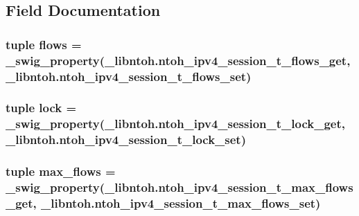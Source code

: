 \subsection{Field Documentation}
\hypertarget{classlibntoh_1_1ntoh__ipv4__session__t_afca3cb4196e6410df799227741f11b5e}{
\subsubsection[{flows}]{\setlength{\rightskip}{0pt plus 5cm}tuple flows = {\bf \-\_\-swig\-\_\-property}(\-\_\-libntoh.\-ntoh\-\_\-ipv4\-\_\-session\-\_\-t\-\_\-flows\-\_\-get, \-\_\-libntoh.\-ntoh\-\_\-ipv4\-\_\-session\-\_\-t\-\_\-flows\-\_\-set)\hspace{0.3cm}{\ttfamily [static]}}}\label{classlibntoh_1_1ntoh__ipv4__session__t_afca3cb4196e6410df799227741f11b5e}
\hypertarget{classlibntoh_1_1ntoh__ipv4__session__t_a871c7bf899334194698c2a3bced5e064}{
\subsubsection[{lock}]{\setlength{\rightskip}{0pt plus 5cm}tuple lock = {\bf \-\_\-swig\-\_\-property}(\-\_\-libntoh.\-ntoh\-\_\-ipv4\-\_\-session\-\_\-t\-\_\-lock\-\_\-get, \-\_\-libntoh.\-ntoh\-\_\-ipv4\-\_\-session\-\_\-t\-\_\-lock\-\_\-set)\hspace{0.3cm}{\ttfamily [static]}}}\label{classlibntoh_1_1ntoh__ipv4__session__t_a871c7bf899334194698c2a3bced5e064}
\hypertarget{classlibntoh_1_1ntoh__ipv4__session__t_af05028fd588ff1bc962a8a89057a3716}{
\subsubsection[{max\-\_\-flows}]{\setlength{\rightskip}{0pt plus 5cm}tuple max\-\_\-flows = {\bf \-\_\-swig\-\_\-property}(\-\_\-libntoh.\-ntoh\-\_\-ipv4\-\_\-session\-\_\-t\-\_\-max\-\_\-flows\-\_\-get, \-\_\-libntoh.\-ntoh\-\_\-ipv4\-\_\-session\-\_\-t\-\_\-max\-\_\-flows\-\_\-set)\hspace{0.3cm}{\ttfamily [static]}}}\label{classlibntoh_1_1ntoh__ipv4__session__t_af05028fd588ff1bc962a8a89057a3716}
